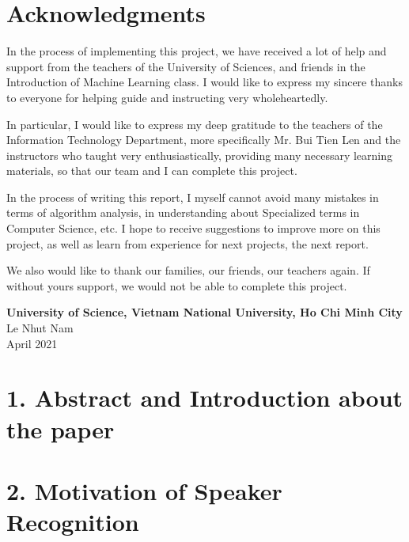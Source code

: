 \documentclass{article}
\begin{document}
	\cleardoublepage
	\section*{Acknowledgments}
	\vspace{1.0in}
	\begingroup
	\setlength{\parindent}{0pt}
	\qquad In the process of implementing this project, we have received a lot of help and support from the teachers of the University of Sciences, and friends in the Introduction of Machine Learning class. I would like to express my sincere thanks to everyone for helping guide and instructing very wholeheartedly.
	
	In particular, I would like to express my deep gratitude to the teachers of the Information Technology Department, more specifically Mr. Bui Tien Len and the instructors who taught very enthusiastically, providing many necessary learning materials, so that  our team and I can complete this project.
	
	In the process of writing this report, I myself cannot avoid many mistakes in terms of algorithm analysis, in understanding about Specialized terms in Computer Science, etc. I hope to receive suggestions to improve more on this project, as well as learn from experience for next projects, the next report.
	
	We also would like to thank our families, our friends, our teachers again. If without yours support, we would not be able to complete this project. 
	
	\vspace{1.0in}
	\textbf{University of Science, Vietnam National University, Ho Chi Minh City}\\
	Le Nhut Nam\\
	April 2021\\
	\endgroup
	
	\newpage
	\tableofcontents
	\newpage
	\setcounter{secnumdepth}{0}
	
	\section{1. Abstract and Introduction about the paper}
	
	
	\section{2. Motivation of Speaker Recognition}
	
\end{document}
